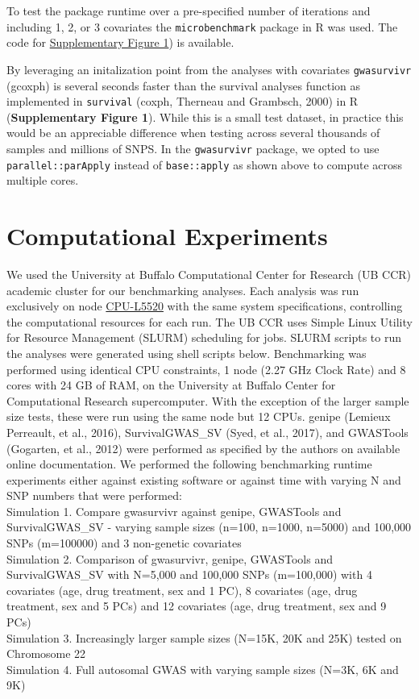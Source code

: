 \documentclass[]{DissertateUSU}
\begin{document}
To test the package runtime over a pre-specified number of iterations
and including 1, 2, or 3 covariates the \texttt{microbenchmark} package
in R was used. The code for
\href{https://github.com/suchestoncampbelllab/gwasurvivr_manuscript/blob/master/supplemental_data/code/SupplementalFigure1.R}{Supplementary
Figure 1}) is available.

By leveraging an initalization point from the analyses with covariates
\texttt{gwasurvivr} (gcoxph) is several seconds faster than the survival
analyses function as implemented in \texttt{survival} (coxph, Therneau
and Grambsch, 2000) in R (\textbf{Supplementary Figure 1}). While this
is a small test dataset, in practice this would be an appreciable
difference when testing across several thousands of samples and millions
of SNPS. In the \texttt{gwasurvivr} package, we opted to use
\texttt{parallel::parApply} instead of \texttt{base::apply} as shown
above to compute across multiple cores.

\section{Computational Experiments}\label{computational-experiments}

We used the University at Buffalo Computational Center for Research (UB
CCR) academic cluster for our benchmarking analyses. Each analysis was
run exclusively on node
\href{https://www.buffalo.edu/ccr/support/research_facilities/general_compute.html}{CPU-L5520}
with the same system specifications, controlling the computational
resources for each run. The UB CCR uses Simple Linux Utility for
Resource Management (SLURM) scheduling for jobs. SLURM scripts to run
the analyses were generated using shell scripts below. Benchmarking was
performed using identical CPU constraints, 1 node (2.27 GHz Clock Rate)
and 8 cores with 24 GB of RAM, on the University at Buffalo Center for
Computational Research supercomputer. With the exception of the larger
sample size tests, these were run using the same node but 12 CPUs.
genipe (Lemieux Perreault, et al., 2016), SurvivalGWAS\_SV (Syed, et
al., 2017), and GWASTools (Gogarten, et al., 2012) were performed as
specified by the authors on available online documentation. We performed
the following benchmarking runtime experiments either against existing
software or against time with varying N and SNP numbers that were
performed:\\
Simulation 1. Compare gwasurvivr against genipe, GWASTools and
SurvivalGWAS\_SV - varying sample sizes (n=100, n=1000, n=5000) and
100,000 SNPs (m=100000) and 3 non-genetic covariates\\
Simulation 2. Comparison of gwasurvivr, genipe, GWASTools and
SurvivalGWAS\_SV with N=5,000 and 100,000 SNPs (m=100,000) with 4
covariates (age, drug treatment, sex and 1 PC), 8 covariates (age, drug
treatment, sex and 5 PCs) and 12 covariates (age, drug treatment, sex
and 9 PCs)\\
Simulation 3. Increasingly larger sample sizes (N=15K, 20K and 25K)
tested on Chromosome 22\\
Simulation 4. Full autosomal GWAS with varying sample sizes (N=3K, 6K
and 9K)
\end{document}
